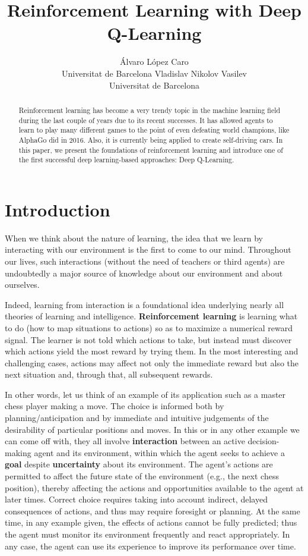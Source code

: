 \documentclass{article}
\title{Reinforcement Learning with Deep Q-Learning}
\author{%
  Álvaro López Caro \\
  Universitat de Barcelona
  \And
  Vladislav Nikolov Vasilev \\
  Universitat de Barcelona
}
\begin{document}
\maketitle

\begin{abstract}
  Reinforcement learning has become a very trendy topic in the machine learning
  field during the last couple of years due to its recent successes. It has allowed
  agents to learn to play many different games to the point of even defeating world
  champions, like AlphaGo did in 2016. Also, it is currently being applied to create
  self-driving cars. In this paper, we present the foundations of reinforcement learning and
  introduce one of the first successful deep learning-based approaches: Deep Q-Learning.
\end{abstract}

\section{Introduction}

When we think about the nature of learning, the idea that we learn by interacting with our
environment is the first to come to our mind. Throughout our lives, such interactions
(without the need of teachers or third agents) are undoubtedly a major source of knowledge about
our environment and about ourselves.

Indeed, learning from interaction is a foundational idea underlying nearly all theories of
learning and intelligence. \textbf{Reinforcement learning} is learning what to do (how to map
situations to actions) so as to maximize a numerical reward signal. The learner is not told
which actions to take, but instead must discover which actions yield the most reward by
trying them. In the most interesting and challenging cases, actions may affect not only
the immediate reward but also the next situation and, through that, all subsequent rewards.

In other words, let us think of an example of its application such as a master chess player
making a move. The choice is informed both by planning/anticipation and by immediate and intuitive
judgements of the desirability of particular positions and moves. In this or in any other example we
can come off with, they all involve \textbf{interaction} between an active decision-making agent and
its environment, within which the agent seeks to achieve a \textbf{goal} despite \textbf{uncertainty}
about its environment. The agent’s actions are permitted to affect the future state of the environment
(e.g., the next chess position), thereby affecting the actions and opportunities
available to the agent at later times. Correct choice requires taking into account indirect,
delayed consequences of actions, and thus may require foresight or planning.
At the same time, in any example given, the effects of actions cannot be fully predicted;
thus the agent must monitor its environment frequently and react appropriately. In any case,
the agent can use its experience to improve its performance over time.
\end{document}
